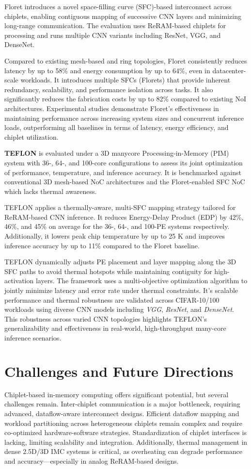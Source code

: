 \documentclass[acmsmall]{acmart}
\begin{document}
Floret introduces a novel space-filling curve (SFC)-based interconnect across chiplets, enabling contiguous mapping of successive CNN layers and minimizing long-range communication. The evaluation uses ReRAM-based chiplets for processing and runs multiple CNN variants including ResNet, VGG, and DenseNet. 

Compared to existing mesh-based and ring topologies, Floret consistently reduces latency by up to 58\% and energy consumption by up to 64\%, even in datacenter-scale workloads. It introduces multiple SFCs (Florets) that provide inherent redundancy, scalability, and performance isolation across tasks. It also
significantly reduces the fabrication costs by up to 82\% compared to existing NoI architectures. Experimental studies demonstrate Floret’s effectiveness in maintaining performance across increasing system sizes and concurrent inference loads, outperforming all baselines in terms of latency, energy efficiency, and chiplet utilization.

\textbf{TEFLON} is evaluated under a 3D manycore Processing-in-Memory (PIM) system with 36-, 64-, and 100-core configurations to assess its joint optimization of performance, temperature, and inference accuracy. It is benchmarked against conventional 3D mesh-based NoC architectures and the Floret-enabled SFC NoC which lacks thermal awareness.

TEFLON applies a thermally-aware, multi-SFC mapping strategy tailored for ReRAM-based CNN inference. It reduces Energy-Delay Product (EDP) by 42\%, 46\%, and 45\% on average for the 36-, 64-, and 100-PE systems respectively. Additionally, it lowers peak chip temperature by up to 25 K and improves inference accuracy by up to 11\% compared to the Floret baseline. 

TEFLON dynamically adjusts PE placement and layer mapping along the 3D SFC paths to avoid thermal hotspots while maintaining contiguity for high-activation layers. The framework uses a multi-objective optimization algorithm to jointly minimize latency and error rate under thermal constraints. It's scalable performance and thermal robustness are validated across CIFAR-10/100 workloads using diverse CNN models including \textit{VGG}, \textit{ResNet}, and \textit{DenseNet}. This robustness across varied CNN topologies highlights TEFLON's generalizability and effectiveness in real-world, high-throughput many-core inference scenarios.


\section{Challenges and Future Directions}
Chiplet-based in-memory computing offers significant potential, but several challenges remain. Inter-chiplet communication is a major bottleneck, requiring advanced, dataflow-aware interconnect designs. Efficient dataflow mapping and workload partitioning across heterogeneous chiplets remain complex and require co-optimized hardware-software strategies. Standardization of chiplet interfaces is lacking, limiting scalability and integration. Additionally, thermal management in dense 2.5D/3D IMC systems is critical, as overheating can degrade performance and accuracy—especially in analog ReRAM-based designs.
\end{document}
